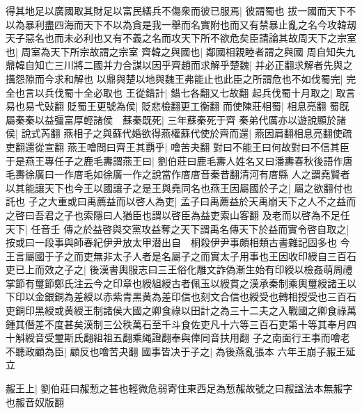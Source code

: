 得其地足以廣國取其財足以富民繕兵不傷衆而彼已服焉|{
	彼謂蜀也}
拔一國而天下不以為暴利盡四海而天下不以為貪是我一舉而名實附也而又有禁暴止亂之名今攻韓刼天子惡名也而未必利也又有不義之名而攻天下所不欲危矣臣請論其故周天下之宗室也|{
	周室為天下所宗故謂之宗室}
齊韓之與國也|{
	鄰國相親睦者謂之與國}
周自知失九鼎韓自知亡三川將二國并力合謀以因乎齊趙而求解乎楚魏|{
	并必正翻求解者先與之搆怨隙而今求和解也}
以鼎與楚以地與魏王弗能止也此臣之所謂危也不如伐蜀完|{
	完全也言以兵伐蜀十全必取也}
王從錯計|{
	錯七各翻又七故翻}
起兵伐蜀十月取之|{
	取言易也易弋䜴翻}
貶蜀王更號為侯|{
	貶悲檢翻更工衡翻}
而使陳莊相蜀|{
	相息亮翻}
蜀旣屬秦秦以益彊富厚輕諸侯　蘇秦既死|{
	三年蘇秦死于齊}
秦弟代厲亦以遊說顯於諸侯|{
	說式芮翻}
燕相子之與蘇代婚欲得燕權蘇代使於齊而還|{
	燕因肩翻相息亮翻使疏吏翻還從宣翻}
燕王噲問曰齊王其覇乎|{
	噲苦夬翻}
對曰不能王曰何故對曰不信其臣于是燕王專任子之鹿毛夀謂燕王曰|{
	劉伯莊曰鹿毛夀人姓名又曰潘夀春秋後語作唐毛夀徐廣曰一作庴毛如徐廣一作之說當作庴庴音秦昔翻清河有庴縣}
人之謂堯賢者以其能讓天下也今王以國讓子之是王與堯同名也燕王因屬國於子之|{
	屬之欲翻付也託也}
子之大重或曰禹薦益而以啓人為吏|{
	孟子曰禹薦益於天禹崩天下之人不之益而之啓曰吾君之子也索隱曰人猶臣也謂以啓臣為益吏索山客翻}
及老而以啓為不足任天下|{
	任音壬}
傳之於益啓與交黨攻益奪之天下謂禹名傳天下於益而實令啓自取之|{
	按或曰一段事與師春紀伊尹放太甲潜出自　桐殺伊尹事頗相類古書雜記固多也}
今王言屬國于子之而吏無非太子人者是名屬子之而實太子用事也王因收印綬自三百石吏已上而效之子之|{
	後漢書輿服志曰三王俗化雕文詐偽漸生始有印綬以檢姦萌周禮掌節有璽節鄭氏注云今之印章也綬組綬古者佩玉以綬貫之漢承秦制乘輿璽綬諸王以下印以金銀銅為差綬以赤紫青黑黄為差印信也刻文合信也綬受也轉相授受也三百石吏銅印黑綬或黄綬王制諸侯大國之卿食祿以田計之為三十二夫之入戰國之卿食祿萬鍾其僭差不度甚矣漢制三公秩萬石至千斗食佐吏凡十六等三百石吏第十等其奉月四十斛綬音受璽斯氏翻組祖五翻乘䋲證翻奉與俸同音扶用翻}
子之南面行王事而噲老不聽政顧為臣|{
	顧反也噲苦夬翻}
國事皆决于子之|{
	為後燕亂張本}
六年王崩子赧王延立

赧王上|{
	劉伯莊曰赧慙之甚也輕微危弱寄住東西足為慙赧故號之曰赧諡法本無赧字也赧音奴版翻}


